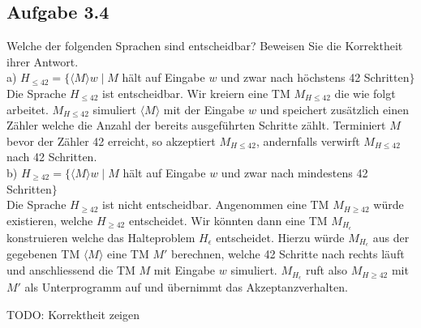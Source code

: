 \subsection*{Aufgabe 3.4}
Welche der folgenden Sprachen sind entscheidbar? Beweisen Sie die Korrektheit ihrer Antwort.\\
a) $H_{\leq 42} = \{\langle M \rangle w \mid M$ hält auf Eingabe $w$ und zwar nach höchstens 42 Schritten$\}$\\

Die Sprache $H_{\leq 42}$ ist entscheidbar. Wir kreiern eine 
TM $M_{H \leq 42}$ die wie folgt arbeitet. $M_{H \leq 42}$
 simuliert $\langle M \rangle$ mit der Eingabe $w$ und 
speichert zusätzlich einen Zähler welche die Anzahl der bereits
ausgeführten Schritte
zählt. Terminiert $M$ bevor der Zähler 42 erreicht, so akzeptiert
$M_{H \leq 42}$, andernfalls verwirft $M_{H \leq 42}$ nach 42
Schritten.\\

b) $H_{\geq 42} = \{\langle M \rangle w \mid M$ hält auf Eingabe $w$ und zwar nach mindestens 42 Schritten$\}$\\

Die Sprache $H_{\geq 42}$ ist nicht entscheidbar. Angenommen eine 
TM $M_{H\geq 42}$ würde existieren, welche $H_{\geq 42}$
entscheidet. Wir könnten dann eine TM $M_{H_{\epsilon}}$
konstruieren welche das Halteproblem $H_{\epsilon}$ entscheidet.
Hierzu würde $M_{H_{\epsilon}}$ aus der gegebenen TM $\langle M 
\rangle$ eine TM 
$M'$ berechnen, welche 42 Schritte nach rechts läuft und 
anschliessend die TM $M$ mit Eingabe $w$ simuliert. 
$M_{H_{\epsilon}}$ ruft also $M_{H\geq 42}$ mit $M'$ als 
Unterprogramm auf und übernimmt das Akzeptanzverhalten.


TODO: Korrektheit zeigen



